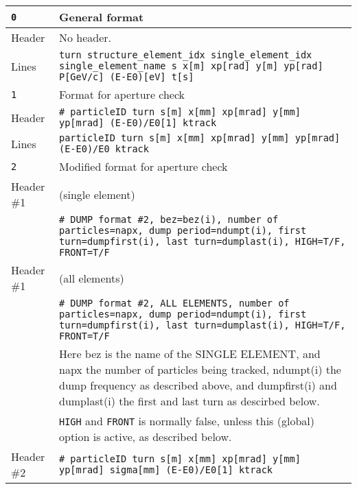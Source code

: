 \begin{center}
\begin{longtable}{|p{1.8cm}|p{13.8cm}|}
        \hline
        \rowcolor{blue!15}
        \texttt{0} & General format \\
        \hline
        Header & No header.\\
        \hline
        Lines  & \texttt{turn structure\_element\_idx single\_element\_idx single\_element\_name s x[m] xp[rad] y[m] yp[rad] P[GeV/c] (E-E0)[eV] t[s]}\\
        \hline
        \rowcolor{blue!15}
        \texttt{1} & Format for aperture check \\
        \hline
        Header & \texttt{\# particleID turn s[m] x[mm] xp[mrad] y[mm] yp[mrad] (E-E0)/E0[1] ktrack} \\
        \hline
        Lines  & \texttt{particleID turn s[m] x[mm] xp[mrad] y[mm] yp[mrad] (E-E0)/E0 ktrack} \\
        \hline
        \rowcolor{blue!15}
        \texttt{2} & Modified format for aperture check \\
        \hline
        Header \#1 & (single element)\\ & \texttt{\# DUMP format \#2, bez=\textcolor{blue!90}{bez(i)}, number of particles=\textcolor{blue!90}{napx}, dump period=\textcolor{blue!90}{ndumpt(i)}, first turn=\textcolor{blue!90}{dumpfirst(i)}, last turn=\textcolor{blue!90}{dumplast(i)}, HIGH=\textcolor{blue!90}{T/F}, FRONT=\textcolor{blue!90}{T/F}} \\
        \hline
        Header \#1 & (all elements)\\ & \texttt{\# DUMP format \#2, ALL ELEMENTS, number of particles=\textcolor{blue!90}{napx}, dump period=\textcolor{blue!90}{ndumpt(i)}, first turn=\textcolor{blue!90}{dumpfirst(i)}, last turn=\textcolor{blue!90}{dumplast(i)}, HIGH=\textcolor{blue!90}{T/F}, FRONT=\textcolor{blue!90}{T/F}}\vspace{1mm} \\
           & Here \textcolor{blue!90}{bez} is the name of the SINGLE ELEMENT, and \textcolor{blue!90}{napx} the number of particles being tracked, \textcolor{blue!90}{ndumpt(i)} the dump frequency as described above, and \textcolor{blue!90}{dumpfirst(i)} and \textcolor{blue!90}{dumplast(i)} the first and last turn as descirbed below.\vspace{1mm} \\
           & \texttt{HIGH} and \texttt{FRONT} is normally false, unless this (global) option is active, as described below.\\
        \hline
        Header \#2 & \texttt{\# particleID turn s[m] x[mm] xp[mrad] y[mm] yp[mrad] sigma[mm] (E-E0)/E0[1] ktrack}\vspace{1mm} \\

\end{longtable}
\end{center}
